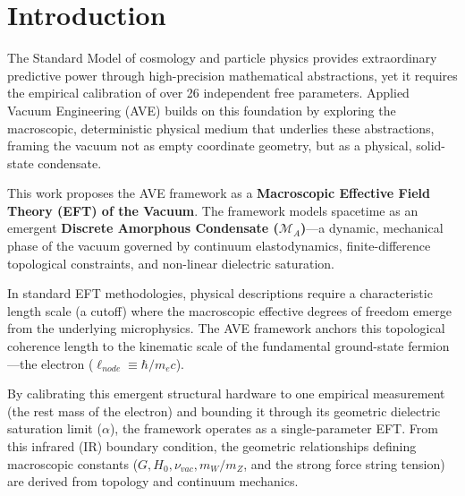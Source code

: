 \chapter*{Introduction}

The Standard Model of cosmology and particle physics provides extraordinary predictive power through high-precision mathematical abstractions, yet it requires the empirical calibration of over 26 independent free parameters. Applied Vacuum Engineering (AVE) builds on this foundation by exploring the macroscopic, deterministic physical medium that underlies these abstractions, framing the vacuum not as empty coordinate geometry, but as a physical, solid-state condensate.

This work proposes the AVE framework as a \textbf{Macroscopic Effective Field Theory (EFT) of the Vacuum}. The framework models spacetime as an emergent \textbf{Discrete Amorphous Condensate ($\mathcal{M}_A$)}---a dynamic, mechanical phase of the vacuum governed by continuum elastodynamics, finite-difference topological constraints, and non-linear dielectric saturation.

In standard EFT methodologies, physical descriptions require a characteristic length scale (a cutoff) where the macroscopic effective degrees of freedom emerge from the underlying microphysics. The AVE framework anchors this topological coherence length to the kinematic scale of the fundamental ground-state fermion---the electron ($\ell_{node} \equiv \hbar / m_e c$).

By calibrating this emergent structural hardware to one empirical measurement (the rest mass of the electron) and bounding it through its geometric dielectric saturation limit ($\alpha$), the framework operates as a single-parameter EFT. From this infrared (IR) boundary condition, the geometric relationships defining macroscopic constants ($G, H_0, \nu_{vac}, m_W/m_Z$, and the strong force string tension) are derived from topology and continuum mechanics.

